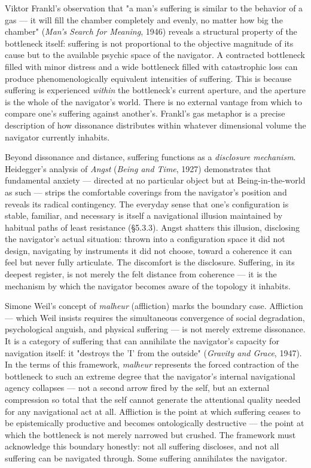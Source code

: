 Viktor Frankl's observation that "a man's suffering is similar to the behavior of a gas — it will fill the chamber completely and evenly, no matter how big the chamber" (\textit{Man's Search for Meaning}, 1946) reveals a structural property of the bottleneck itself: suffering is not proportional to the objective magnitude of its cause but to the available psychic space of the navigator. A contracted bottleneck filled with minor distress and a wide bottleneck filled with catastrophic loss can produce phenomenologically equivalent intensities of suffering. This is because suffering is experienced \textit{within} the bottleneck's current aperture, and the aperture is the whole of the navigator's world. There is no external vantage from which to compare one's suffering against another's. Frankl's gas metaphor is a precise description of how dissonance distributes within whatever dimensional volume the navigator currently inhabits.


Beyond dissonance and distance, suffering functions as a \textit{disclosure mechanism}. Heidegger's analysis of \textit{Angst} (\textit{Being and Time}, 1927) demonstrates that fundamental anxiety — directed at no particular object but at Being-in-the-world as such — strips the comfortable coverings from the navigator's position and reveals its radical contingency. The everyday sense that one's configuration is stable, familiar, and necessary is itself a navigational illusion maintained by habitual paths of least resistance (§5.3.3). Angst shatters this illusion, disclosing the navigator's actual situation: thrown into a configuration space it did not design, navigating by instruments it did not choose, toward a coherence it can feel but never fully articulate. The discomfort is the disclosure. Suffering, in its deepest register, is not merely the felt distance from coherence — it is the mechanism by which the navigator becomes aware of the topology it inhabits.


Simone Weil's concept of \textit{malheur} (affliction) marks the boundary case. Affliction — which Weil insists requires the simultaneous convergence of social degradation, psychological anguish, and physical suffering — is not merely extreme dissonance. It is a category of suffering that can annihilate the navigator's capacity for navigation itself: it "destroys the 'I' from the outside" (\textit{Gravity and Grace}, 1947). In the terms of this framework, \textit{malheur} represents the forced contraction of the bottleneck to such an extreme degree that the navigator's internal navigational agency collapses — not a second arrow fired by the self, but an external compression so total that the self cannot generate the attentional quality needed for any navigational act at all. Affliction is the point at which suffering ceases to be epistemically productive and becomes ontologically destructive — the point at which the bottleneck is not merely narrowed but crushed. The framework must acknowledge this boundary honestly: not all suffering discloses, and not all suffering can be navigated through. Some suffering annihilates the navigator.


